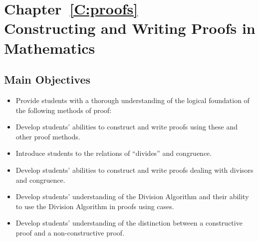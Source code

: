 \chapter*{Chapter~\ref{C:proofs} \\Constructing and Writing Proofs in Mathematics}

\section*{Main Objectives}
\begin{itemize}
\item Provide students with a thorough understanding of the logical foundation of the following methods of proof:
\begin{multicols}{2}
\end{multicols}
\item Develop students' abilities to construct and write proofs using these and other proof methods.
\item Introduce students to the relations of ``divides'' and congruence.
\item Develop students' abilities to construct and write proofs dealing with divisors and congruence.
\item Develop students' understanding of the Division Algorithm and their ability to use the Division Algorithm in proofs using cases.
\item Develop students' understanding of the distinction between a constructive proof and a non-constructive proof.
\end{itemize}
\hbreak

\endinput







\chapter*{Chapter~\ref{C:settheory} \\Set Theory}

